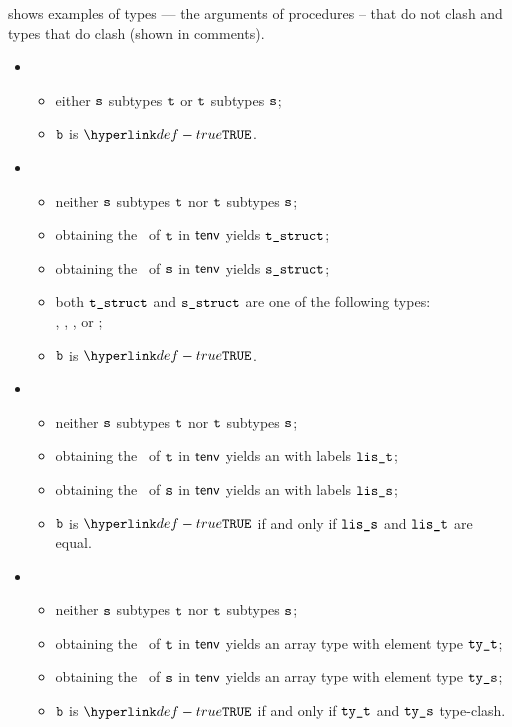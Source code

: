  shows examples of types ---
the arguments of procedures -- that do not clash and types that do clash
(shown in comments).

\ProseParagraph
\OneApplies
\begin{itemize}
  \item {}
  \begin{itemize}
    \item either $\texttt{s}$ subtypes $\texttt{t}$ or $\texttt{t}$ subtypes $\texttt{s}$;
    \item $\texttt{b}$ is $\True$.
  \end{itemize}

  \item {}
  \begin{itemize}
    \item neither $\texttt{s}$ subtypes $\texttt{t}$ nor $\texttt{t}$ subtypes $\texttt{s}$;
    \item obtaining the \structure\ of $\texttt{t}$ in $\textsf{tenv}$ yields $\texttt{t\_struct}$\ProseOrTypeError;
    \item obtaining the \structure\ of $\texttt{s}$ in $\textsf{tenv}$ yields $\texttt{s\_struct}$\ProseOrTypeError;
    \item both $\texttt{t\_struct}$ and $\texttt{s\_struct}$ are one of the following types: \\
          \booleantypesterm{}, \integertypeterm{}, \realtypeterm{}, or \stringtypeterm{};
    \item $\texttt{b}$ is $\True$.
  \end{itemize}

  \item {}
  \begin{itemize}
    \item neither $\texttt{s}$ subtypes $\texttt{t}$ nor $\texttt{t}$ subtypes $\texttt{s}$;
    \item obtaining the \structure\ of $\texttt{t}$ in $\textsf{tenv}$ yields an \enumerationtypeterm{} with labels $\texttt{lis\_t}$;
    \item obtaining the \structure\ of $\texttt{s}$ in $\textsf{tenv}$ yields an \enumerationtypeterm{} with labels $\texttt{lis\_s}$;
    \item $\texttt{b}$ is $\True$ if and only if $\texttt{lis\_s}$ and $\texttt{lis\_t}$ are equal.
  \end{itemize}

  \item {}
  \begin{itemize}
    \item neither $\texttt{s}$ subtypes $\texttt{t}$ nor $\texttt{t}$ subtypes $\texttt{s}$;
    \item obtaining the \structure\ of $\texttt{t}$ in $\textsf{tenv}$ yields an array type with element type $\texttt{ty\_t}$;
    \item obtaining the \structure\ of $\texttt{s}$ in $\textsf{tenv}$ yields an array type with element type $\texttt{ty\_s}$;
    \item $\texttt{b}$ is $\True$ if and only if $\texttt{ty\_t}$ and $\texttt{ty\_s}$ type-clash.
  \end{itemize}


\end{itemize}
